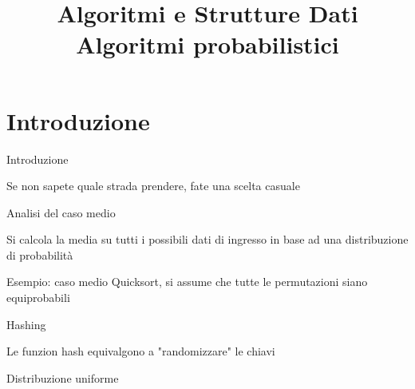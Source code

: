 
\title[ASD - Algoritmi probabilistici]{\textbf{Algoritmi e Strutture Dati}\\[24pt]Algoritmi probabilistici}

\usepackage[mode=buildnew]{standalone}
\usepackage{xcolor}
\usepackage{colortbl}
\usepackage{epigraph}
\usepackage{tikz}
\usepackage{xmpmulti}
\usepackage{listings}


\newcommand{\R}[1]{\textcolor{red}{#1}}
\newcommand{\B}[1]{\textcolor{blue}{#1}}

\renewcommand{\Primo}{\mathit{start}\xspace}
\renewcommand{\Ultimo}{\mathit{end}\xspace}

\renewcommand{\arraystretch}{1.4}
\graphicspath{{figs/17/}}





\FrameTitle{}

\FrameContent



\section{Introduzione}

\begin{frame}{Introduzione}

\BIL
\item Se non sapete quale strada prendere, fate una scelta casuale
\EIL

\BIL
\item Analisi del caso medio
  \BI
  \item Si calcola la media su tutti i possibili dati di ingresso
  in base ad una distribuzione di probabilità
  \item Esempio: caso medio Quicksort, si assume che tutte 
  le permutazioni siano equiprobabili
  \EI
\item Hashing
  \BI 
  \item Le funzion hash equivalgono a "randomizzare" le chiavi
  \item Distribuzione uniforme
  \EI
\EIL

\end{frame}

